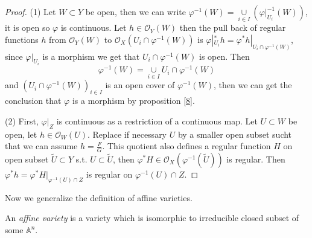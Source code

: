 \begin{proof}
	(1) Let $ W\subset Y $ be open, then we can write $ \varphi^{-1}(W)=\mathop{\cup}\limits_{i\in I}(\varphi|_{U_i}^{-1}(W)) $, it is open so $ \varphi $ is continuous. Let $ h\in \mathcal{O}_{Y}(W) $ then the pull back of regular functions $ h $ from $ \mathcal{O}_Y(W) $ to $ \mathcal{O}_X(U_i\cap \varphi^{-1}(W)) $ is $ \varphi|_{U_i}^\ast h=\varphi^\ast h|_{U_i\cap \varphi^{-1}(W)} $, since $ \varphi|_{U_i} $ is a morphism we get that $ U_i\cap \varphi^{-1}(W) $ is open. Then
	\begin{equation}
		\varphi^{-1}(W)=\mathop{\cup}\limits_{i\in I} U_i\cap \varphi^{-1}(W)
	\end{equation}
	and $ (U_i\cap \varphi^{-1}(W) )_{i\in I}$ is an open cover of $ \varphi^{-1}(W) $, then we can get the conclusion that $ \varphi $ is a morphism by proposition \ref{8}.

	(2) First, $ \varphi|_Z $ is continuous as a restriction of a continuous map. Let $ U\subset W $ be open, let $ h\in \mathcal{O}_W(U) $. Replace if necessary $ U $ by a smaller open subset sucht that we can assume $ h=\frac{F}{G} $. This quotient also defines a regular function $ H $ on open subset $ \tilde{U}\subset Y $ s.t. $ U\subset \tilde{U} $, then $ \varphi^\ast H\in \mathcal{O}_X(\varphi^{-1}(\tilde{U}))  $ is regular. Then $ \varphi^\ast h= \varphi^\ast H|_{\varphi^{-1}(U)\cap Z} $ is regular on $ \varphi^{-1}(U)\cap Z $.
\end{proof}



Now we  generalize the definition of affine varieties.
\begin{definition}
	An \textit{affine variety} is a variety which is isomorphic to irreducible closed subset of some $ \mathbb{A}^n $.
\end{definition}

